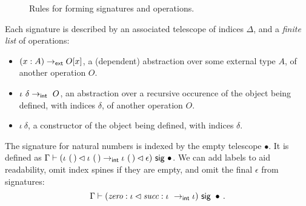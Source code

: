 \enlargethispage{\baselineskip}

\begin{figure}[H]
  \caption{Rules for forming signatures and operations.}
\end{figure}

Each signature is described by an associated telescope of indices $\Delta$, and a
\emph{finite list} of operations:
\begin{itemize}
    \item $(x : A) \to_{\textsf{ext}} O[x]$, a (dependent) abstraction over some external type $A$, of another operation $O$.
    \item $\iota\ \delta \to\internal \ O$, an
      abstraction over a recursive occurence of
      the object being defined, with indices $\delta$, of another operation
      $O$.
    \item $\iota\ \delta$, a constructor of the object being defined, with indices $\delta$.
\end{itemize}

\begin{example}\label{ex:nat-sig}
The signature for natural numbers is indexed by the empty telescope $\bullet$.
It is defined as $\Gamma \vdash (\iota\ (\,) \lhd \iota\ (\,) \to_{\textsf{int}}
\iota\ (\,) \lhd \epsilon) \ \textsf{sig}\  \bullet$. We can add labels to aid readability,
omit index spines if they are empty, and omit the final $\epsilon$ from
signatures:
\[
\Gamma \vdash (\textit{zero} : \iota \lhd \textit{succ} : \iota\ \to_{\textsf{int}}
\iota) \ \textsf{sig}\  \bullet \,.
\]
\end{example}

